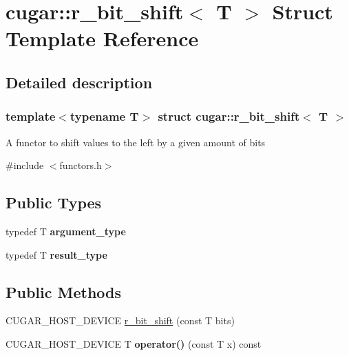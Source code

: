 \hypertarget{structcugar_1_1r__bit__shift}{}\section{cugar\+:\+:r\+\_\+bit\+\_\+shift$<$ T $>$ Struct Template Reference}
\label{structcugar_1_1r__bit__shift}


\subsection{Detailed description}
\subsubsection*{template$<$typename T$>$\newline
struct cugar\+::r\+\_\+bit\+\_\+shift$<$ T $>$}

A functor to shift values to the left by a given amount of bits 

{\ttfamily \#include $<$functors.\+h$>$}

\subsection*{Public Types}
\begin{DoxyCompactItemize}
\item 
\mbox{\label{structcugar_1_1r__bit__shift_ae7877eb020e0d14f828a238747010371}} 
typedef T {\bfseries argument\+\_\+type}
\item 
\mbox{\label{structcugar_1_1r__bit__shift_a4a2feb7214cb7f1259881ef9b8daaeb4}} 
typedef T {\bfseries result\+\_\+type}
\end{DoxyCompactItemize}
\subsection*{Public Methods}
\begin{DoxyCompactItemize}
\item 
C\+U\+G\+A\+R\+\_\+\+H\+O\+S\+T\+\_\+\+D\+E\+V\+I\+CE \hyperlink{structcugar_1_1r__bit__shift_a6586c9c3e3c80eafcfae7ddedca55075}{r\+\_\+bit\+\_\+shift} (const T bits)
\item 
\mbox{\label{structcugar_1_1r__bit__shift_a8be3444fc7d77606a2777be08a2b0e15}} 
C\+U\+G\+A\+R\+\_\+\+H\+O\+S\+T\+\_\+\+D\+E\+V\+I\+CE T {\bfseries operator()} (const T x) const
\end{DoxyCompactItemize}


